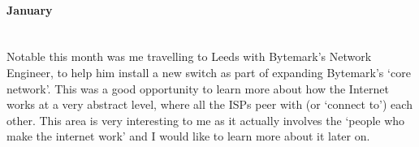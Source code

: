 \documentclass[12pt,a4paper]{article}
\newcommand{\paragraphnl}[1]{\paragraph{#1}\mbox{}\\}
\begin{document}

\paragraphnl{January}
	Notable this month was me travelling to Leeds with Bytemark's Network
	Engineer, to help him install a new switch as part of expanding Bytemark's
	`core network'. This was a good opportunity to learn more about how the
	Internet works at a very abstract level, where all the ISPs peer with (or
	`connect to') each other. This area is very interesting to me as it
	actually involves the `people who make the internet work' and I would like
	to learn more about it later on.



\end{document}
